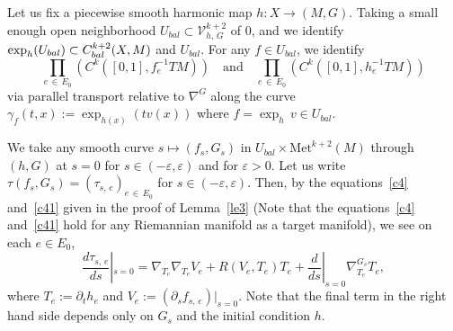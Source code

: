\documentclass[11pt]{article}
\theoremstyle{definition}
\numberwithin{equation}{section}
\renewcommand{\t}{\tau}
\newcommand{\e}{\varepsilon}
\newcommand{\p}{\psi}
\newcommand*\Vc{\mathcal{V}}
\newcommand*\Met{\mathrm{Met}}
\renewcommand*\p{\partial}
\begin{document}
Let us fix a piecewise smooth harmonic map $h: X\to (M,G)$. Taking a small enough open neighborhood $U_{bal}\subset \Vc_{h,\,G}^{k+2}$ of $0$, and we identify ${\exp}_h(U_{bal})\subset C^{k+2}_{bal}\linebreak(X, M)$ and $U_{bal}$. For any $f \in U_{bal}$, we identify
\[
\prod_{e\,\in\,E_0}\left(C^k\left([0, 1], f_e^{-1}TM\right)\right) \quad \text{and} \quad \prod_{e\,\in\, E_0}\left(C^k\left([0, 1], h_e^{-1}TM\right)\right)
\]
via parallel transport relative to $\nabla^G$ along the curve $\gamma_f(t,x):=\exp_{h(x)}(tv(x))$ where $f=\exp_h\, v\in U_{bal}$.



We take any smooth curve $s \mapsto (f_s, G_s)$ in $U_{bal}\times \Met^{k+2}(M)$ through $(h, G)$ at $s=0$ for $s \in (-\e, \e)$ and for $\e>0$. Let us write $\t(f_s, G_s)=(\t_{s,\,e})_{e\,\in\,E_0}$ for $s \in (-\e, \e)$. Then, by the equations~\eqref{c4} and~\eqref{c41} given in the proof of Lemma~\ref{le3} (Note that the equations~\eqref{c4} and~\eqref{c41} hold for any Riemannian manifold as a target manifold), we see on each $e \in E_0$,
\begin{equation}\label{derivtau}
\frac{d\tau_{s,\,e}}{ds}\left|_{s=0}=\nabla_{T_e}\nabla_{T_e}V_e+R\left(V_e, T_e\right)T_e+\frac{d}{ds}\right|_{s=0} \nabla^{G_s}_{T_e}T_e,
\end{equation}
where $T_e:=\p_t h_e$ and $V_e:=(\partial_s f_{s, \,e})|_{s=0}$. Note that the final term in the right hand side depends only on $G_s$ and the initial condition $h$.
\end{document}
